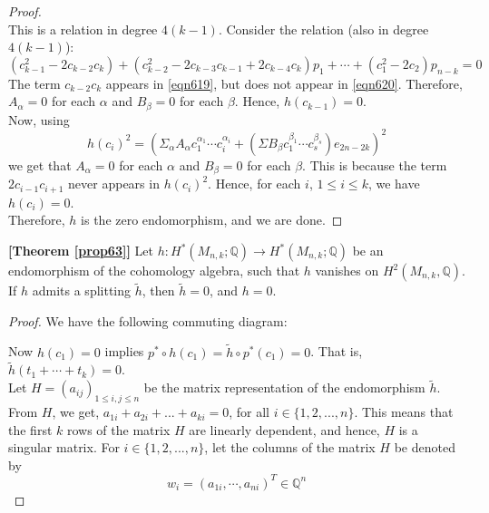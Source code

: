 \documentclass[a4paper,leqno,12pt]{amsart}
\theoremstyle{plain}
\theoremstyle{definition}
\theoremstyle{remark}
\newcommand{\Q}{\mathbb{Q}}
\begin{document}
{\begin{proof}
\begin{equation}
\label{eqn620}
\end{equation} 
This is a relation in degree $4(k-1)$.  Consider the relation (also in degree $4(k-1)$): 
\begin{equation}
    (c_{k-1}^{2}-2c_{k-2}c_{k})+(c_{k-2}^{2}-2c_{k-3}c_{k-1}+2c_{k-4}c_{k})p_{1}+ \cdots + (c_{1}^{2}-2c_{2})p_{n-k}=0
    \label{eqn619}
\end{equation}
The term $c_{k-2} c_{k}$ appears in \ref{eqn619},  but does not appear in \ref{eqn620}.  Therefore,  $A_{\alpha} =0$ for each $\alpha$ and $B_{\beta} =0$ for each $\beta$.  Hence,  $h(c_{k-1}) =0$.  \\

\noindent
Now,  using 
\begin{equation}
h(c_{i})^{2} = (\Sigma_{\alpha} A_{\alpha} c_{1}^{\alpha_{1}} \cdots c_{i}^{\alpha_{i}} + (\Sigma B_{\beta} c_{1}^{\beta_{1}} \cdots c_{s}^{\beta_{s}})e_{2n-2k})^{2}
\end{equation}
we get that $A_{\alpha} =0$ for each $\alpha$ and $B_{\beta} =0$ for each $\beta$.  This is because  the term $2c_{i-1} c_{i+1}$ never appears in $h(c_{i})^{2}$.  
Hence,  for each $i$,  $1\leq i \leq k$,  we have $h(c_{i}) =0$.   \\
\noindent
Therefore,  $h$ is the zero endomorphism,  and we are done. 

 \end{proof}
 
 \begin{myprop}{\bf [Theorem \ref{prop63}]} %
 Let $h:H^{*}(M_{n,k}; \Q) \to H^{*}(M_{n,k}; \Q)$  be an endomorphism of the cohomology algebra,  such that $h$ vanishes on $H^{2}(M_{n,k} ,  \Q)$.   If $h$ admits a splitting $\widetilde{h}$,   then $\widetilde{h} =0$,  and $h =0$. 
\end{myprop}

\begin{proof}
We have the following commuting diagram: 



\noindent
Now $h(c_{1})=0$ implies $p^{*}\circ h(c_{1})= \widetilde{h}\circ p^{*}(c_{1}) = 0$.  That is,   $ \widetilde{h}(t_{1}+\cdots +t_{k})=0$.  \\
Let $ H = (a_{ij})_{1 \leq i, j \leq n}$ be the matrix representation of the endomorphism $\widetilde{h}$.  
From  $H$,  we get,   $a_{1i}+a_{2i}+...+a_{ki}=0$,  for all $i \in \{1,2,...,n\}$.  
This means that the first $k$ rows of the matrix $H$ are linearly dependent,  and hence,  $H$ is a singular matrix.  
For $i \in \{1,2,...,n\}$,  let the columns of the matrix $H$ be denoted by 
\begin{equation}
w_{i} =   (a_{1i},  \cdots , a_{ni})^{T}         
\in \mathbb{Q}^{n}
\nonumber
\end{equation}


\end{proof}}
\end{document}
